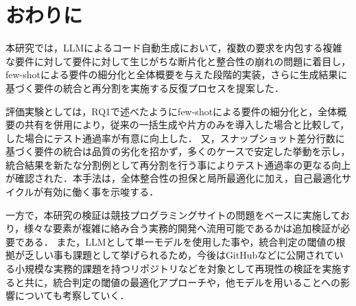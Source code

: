\documentclass[submit,techrep,noauthor]{ipsj}
\begin{document}

\section{おわりに}
\label{sec:conclusion}
本研究では，LLMによるコード自動生成において，複数の要求を内包する複雑な要件に対して要件に対して生じがちな断片化と整合性の崩れの問題に着目し，few-shotによる要件の細分化と全体概要を与えた段階的実装，さらに生成結果に基づく要件の統合と再分割を実施する反復プロセスを提案した．

評価実験としては，RQ1で述べたようにfew-shotによる要件の細分化と，全体概要の共有を併用により，従来の一括生成や片方のみを導入した場合と比較して，した場合にテスト通過率が有意に向上した．
又，スナップショット差分行数に基づく要件の統合は品質の劣化を招かず，多くのケースで安定した挙動を示し，統合結果を新たな分割例として再分割を行う事によりテスト通過率の更なる向上が確認された．本手法は，全体整合性の担保と局所最適化に加え，自己最適化サイクルが有効に働く事を示唆する．

一方で，本研究の検証は競技プログラミングサイトの問題をベースに実施しており，様々な要素が複雑に絡み合う実務的開発へ流用可能であるかは追加検証が必要である．
また，LLMとして単一モデルを使用した事や，統合判定の閾値の根拠が乏しい事も課題として挙げられるため，今後はGitHubなどに公開されている小規模な実務的課題を持つリポジトリなどを対象として再現性の検証を実施すると共に，統合判定の閾値の最適化アプローチや，他モデルを用いることへの影響についても考察していく．




\end{document}
